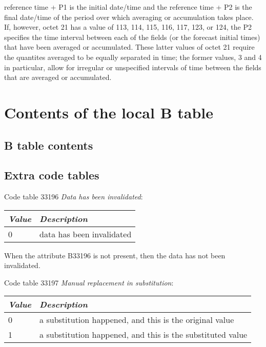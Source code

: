 \documentclass[final,12pt,a4paper,twoside]{book}
\begin{document}
\begin{itemize}
      reference time + P1  is the initial date/time and the reference time + P2
      is the final date/time of the period over which averaging or accumulation
      takes place. If, however, octet 21 has a value of 113, 114, 115, 116,
      117, 123, or 124, the P2 specifies the time interval between each of the
      fields (or the forecast initial times) that have been averaged or
      accumulated. These latter values of octet 21 require the quantites
      averaged to be equally separated in time; the former values, 3 and 4 in
      particular, allow for irregular or unspecified intervals of time between
      the fields that are averaged or accumulated.
\end{itemize}


\chapter{Contents of the local B table}

\section{B table contents}

\label{btable}


\section{Extra code tables}

Code table 33196 \emph{Data has been invalidated}:

\begin{tabular}{|l|l|}
\hline
{\em Value} & {\em Description}               \\
\hline
          0 & data has been invalidated       \\
\hline
\end{tabular}

When the attribute B33196 is not present, then the data has not been
invalidated.

Code table 33197 \emph{Manual replacement in substitution}:

\begin{tabular}{|l|l|}
\hline
{\em Value} & {\em Description}               \\
\hline
          0 & a substitution happened, and this is the original value    \\
          1 & a substitution happened, and this is the substituted value \\
\hline
\end{tabular}
\end{document}
